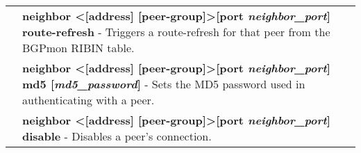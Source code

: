 \begin{tabular}{|p{10pt}p{400pt}|}
& {\bf \small neighbor \textless[address] [peer-group]\textgreater [port \emph{neighbor\_port}] route-refresh} - Triggers a route-refresh for that peer from the BGPmon RIBIN table. \\[4pt]

& {\bf \small neighbor \textless[address] [peer-group]\textgreater [port \emph{neighbor\_port}] md5 [\emph{md5\_password}]} - Sets the MD5 password used in authenticating with a peer. \\[4pt]

& {\bf \small neighbor \textless[address] [peer-group]\textgreater [port \emph{neighbor\_port}] disable} - Disables a peer's connection. \\[4pt]

\hline

\end{tabular}

